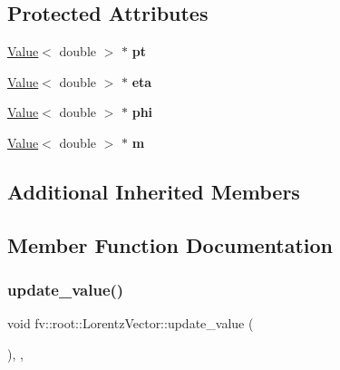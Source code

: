 \subsection*{Protected Attributes}
\begin{DoxyCompactItemize}
\item 
\hypertarget{classfv_1_1root_1_1LorentzVector_a6cc4ec252925bf661983805df21d9117}{}\label{classfv_1_1root_1_1LorentzVector_a6cc4ec252925bf661983805df21d9117} 
\hyperlink{classfv_1_1Value}{Value}$<$ double $>$ $\ast$ {\bfseries pt}
\item 
\hypertarget{classfv_1_1root_1_1LorentzVector_ade73b3be2bc5e1d15a9b5cc7ea83f0f4}{}\label{classfv_1_1root_1_1LorentzVector_ade73b3be2bc5e1d15a9b5cc7ea83f0f4} 
\hyperlink{classfv_1_1Value}{Value}$<$ double $>$ $\ast$ {\bfseries eta}
\item 
\hypertarget{classfv_1_1root_1_1LorentzVector_a3d54673347327d4c879c08446333aa6d}{}\label{classfv_1_1root_1_1LorentzVector_a3d54673347327d4c879c08446333aa6d} 
\hyperlink{classfv_1_1Value}{Value}$<$ double $>$ $\ast$ {\bfseries phi}
\item 
\hypertarget{classfv_1_1root_1_1LorentzVector_a6e5edb143de329d47c95bf8f0c3b2b26}{}\label{classfv_1_1root_1_1LorentzVector_a6e5edb143de329d47c95bf8f0c3b2b26} 
\hyperlink{classfv_1_1Value}{Value}$<$ double $>$ $\ast$ {\bfseries m}
\end{DoxyCompactItemize}
\subsection*{Additional Inherited Members}


\subsection{Member Function Documentation}
\hypertarget{classfv_1_1root_1_1LorentzVector_aeb17320a2024bd189dad4117cf1f54fb}{}\label{classfv_1_1root_1_1LorentzVector_aeb17320a2024bd189dad4117cf1f54fb} 
\subsubsection{\texorpdfstring{update\+\_\+value()}{update\_value()}}
{\footnotesize\ttfamily void fv\+::root\+::\+Lorentz\+Vector\+::update\+\_\+value (\begin{DoxyParamCaption}{ }\end{DoxyParamCaption})\hspace{0.3cm}{\ttfamily [inline]}, {\ttfamily [protected]}, {\ttfamily [virtual]}}



